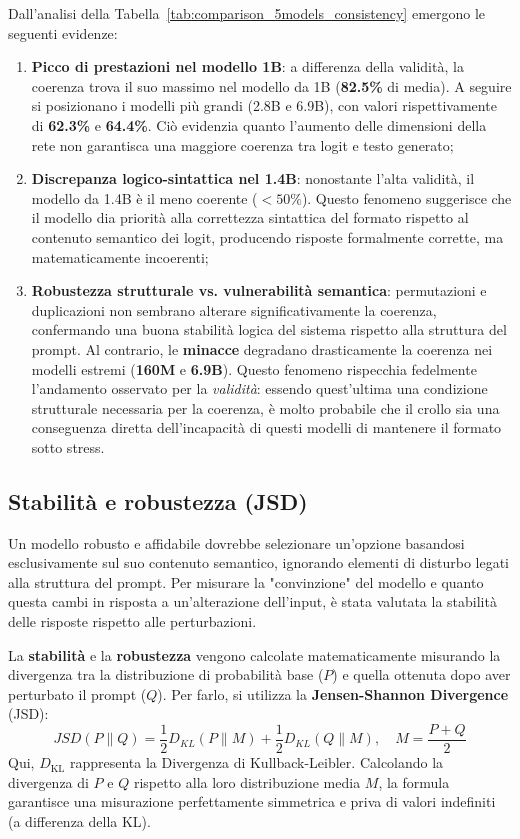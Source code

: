 \documentclass[../relazione.tex]{subfiles}
\begin{document}
\normalsize
Dall'analisi della Tabella~\ref{tab:comparison_5models_consistency} emergono le seguenti evidenze:
\begin{enumerate}
    \item \textbf{Picco di prestazioni nel modello 1B}: a differenza della validità, la coerenza trova il suo massimo nel modello da 1B (\textbf{82.5\%} di media). A seguire si posizionano i modelli più grandi (2.8B e 6.9B), con valori rispettivamente di \textbf{62.3\%} e \textbf{64.4\%}. Ciò evidenzia quanto l'aumento delle dimensioni della rete non garantisca una maggiore coerenza tra logit e testo generato;
    
    \item \textbf{Discrepanza logico-sintattica nel 1.4B}: nonostante l'alta validità, il modello da 1.4B è il meno coerente ($<50\%$). Questo fenomeno suggerisce che il modello dia priorità alla correttezza sintattica del formato rispetto al contenuto semantico dei logit, producendo risposte formalmente corrette, ma matematicamente incoerenti;
    
    \item \textbf{Robustezza strutturale vs. vulnerabilità semantica}: permutazioni e duplicazioni non sembrano alterare significativamente la coerenza, confermando una buona stabilità logica del sistema rispetto alla struttura del prompt. Al contrario, le \textbf{minacce} degradano drasticamente la coerenza nei modelli estremi (\textbf{160M} e \textbf{6.9B}). Questo fenomeno rispecchia fedelmente l'andamento osservato per la \textit{validità}: essendo quest'ultima una condizione strutturale necessaria per la coerenza, è molto probabile che il crollo sia una conseguenza diretta dell'incapacità di questi modelli di mantenere il formato sotto stress.
\end{enumerate}

\subsection{Stabilità e robustezza (JSD)}
Un modello robusto e affidabile dovrebbe selezionare un'opzione basandosi esclusivamente sul suo contenuto semantico, ignorando elementi di disturbo legati alla struttura del prompt. Per misurare la "convinzione" del modello e quanto questa cambi in risposta a un'alterazione dell'input, è stata valutata la stabilità delle risposte rispetto alle perturbazioni.

La \textbf{stabilità} e la \textbf{robustezza} vengono calcolate matematicamente misurando la divergenza tra la distribuzione di probabilità base ($P$) e quella ottenuta dopo aver perturbato il prompt ($Q$). Per farlo, si utilizza la \textbf{Jensen-Shannon Divergence} (JSD):
$$JSD(P \parallel Q) = \frac{1}{2} D_{KL}(P \parallel M) + \frac{1}{2} D_{KL}(Q \parallel M), \quad M = \frac{P+Q}{2}$$
Qui, $D_{\text{KL}}$ rappresenta la Divergenza di Kullback-Leibler.
Calcolando la divergenza di $P$ e $Q$ rispetto alla loro distribuzione media $M$, la formula garantisce una misurazione perfettamente simmetrica e priva di valori indefiniti (a differenza della KL). 
\end{document}
